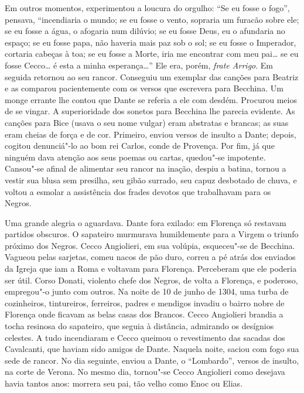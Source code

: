 Em outros momentos, experimentou a loucura do orgulho: “Se eu fosse o fogo'',
pensava, ``incendiaria o mundo; se eu fosse o vento, sopraria um furacão
sobre ele; se eu fosse a água, o afogaria num dilúvio; se eu fosse Deus,
eu o afundaria no espaço; se eu fosse papa, não haveria mais paz sob o
sol; se eu fosse o Imperador, cortaria cabeças à toa; se eu fosse a Morte,
iria me encontrar com meu pai\ldots{} se eu fosse Cecco\ldots{} é esta a minha
esperança\ldots{}” Ele era, porém, \textit{frate Arrigo}. Em seguida retornou
ao seu rancor. Conseguiu um exemplar das canções para Beatriz e as
comparou pacientemente com os versos que escrevera para Becchina. Um monge
errante lhe contou que Dante se referia a ele com desdém. Procurou meios
de se vingar. A superioridade dos sonetos para Becchina lhe parecia
evidente. As canções para Bice (usava o seu nome vulgar) eram abstratas e
brancas; as suas eram cheias de força e de cor. Primeiro, enviou versos de
insulto a Dante; depois, cogitou denunciá"-lo ao bom rei Carlos, conde de
Provença. Por fim, já que ninguém dava atenção aos seus poemas ou cartas,
quedou"-se impotente. Cansou"-se afinal de alimentar seu rancor na inação,
despiu a batina, tornou a vestir sua blusa sem presilha, seu gibão
surrado, seu capuz desbotado de chuva, e voltou a esmolar a assistência
dos frades devotos que trabalhavam para os Negros.

Uma grande alegria o aguardava. Dante fora exilado: em Florença só restavam
partidos obscuros. O sapateiro murmurava humildemente para a Virgem o
triunfo próximo dos Negros. Cecco Angiolieri, em sua volúpia, esqueceu"-se
de Becchina. Vagueou pelas sarjetas, comeu nacos de pão duro, correu a pé
atrás dos enviados da Igreja que iam a Roma e voltavam para Florença.
Perceberam que ele poderia ser útil. Corso Donati, violento chefe dos
Negros, de volta a Florença, e poderoso, empregou"-o junto com outros. Na
noite de 10 de junho de 1304, uma turba de cozinheiros, tintureiros,
ferreiros, padres e mendigos invadiu o bairro nobre de Florença onde
ficavam as belas casas dos Brancos. Cecco Angiolieri brandia a tocha
resinosa do sapateiro, que seguia à distância, admirando os desígnios
celestes. A tudo incendiaram e Cecco queimou o revestimento das sacadas
dos Cavalcanti, que haviam sido amigos de Dante. Naquela noite, saciou com
fogo sua sede de rancor. No dia seguinte, enviou a Dante, o “Lombardo”,
versos de insulto, na corte de Verona. No mesmo dia, tornou"-se Cecco
Angiolieri como desejava havia tantos anos: morrera seu pai, tão velho
como Enoc ou Elias.

